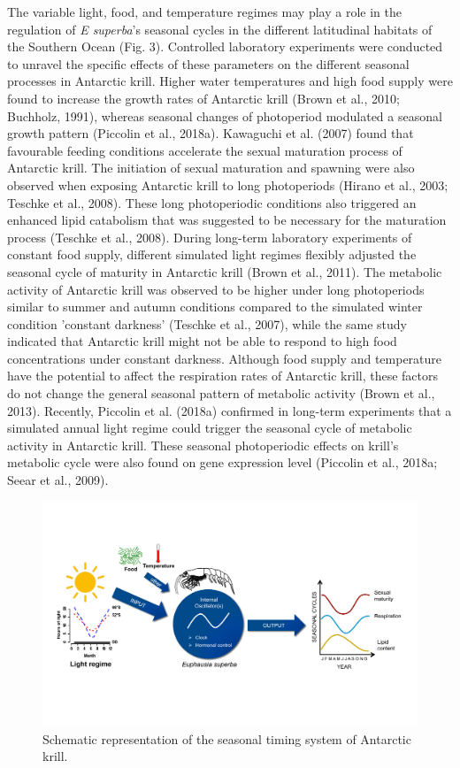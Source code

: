 The variable light, food, and temperature regimes may play a role in the
regulation of \textit{E superba}'s seasonal cycles in the different latitudinal
habitats of the Southern Ocean (Fig. 3). Controlled laboratory experiments were
conducted to unravel the specific effects of these parameters on the different
seasonal processes in Antarctic krill. Higher water temperatures and high food
supply were found to increase the growth rates of Antarctic krill (Brown et
al., 2010; Buchholz, 1991), whereas seasonal changes of photoperiod modulated a
seasonal growth pattern (Piccolin et al., 2018a). Kawaguchi et al. (2007) found
that favourable feeding conditions accelerate the sexual maturation process of
Antarctic krill. The initiation of sexual maturation and spawning were also
observed when exposing Antarctic krill to long photoperiods (Hirano et al.,
2003; Teschke et al., 2008). These long photoperiodic conditions also triggered
an enhanced lipid catabolism that was suggested to be necessary for the
maturation process (Teschke et al., 2008). During long-term laboratory
experiments of constant food supply, different simulated light regimes flexibly
adjusted the seasonal cycle of maturity in Antarctic krill (Brown et al.,
2011). The metabolic activity of Antarctic krill was observed to be higher
under long photoperiods similar to summer and autumn conditions compared to the
simulated winter condition 'constant darkness' (Teschke et al., 2007), while
the same study indicated that Antarctic krill might not be able to respond to
high food concentrations under constant darkness. Although food supply and
temperature have the potential to affect the respiration rates of Antarctic
krill, these factors do not change the general seasonal pattern of metabolic
activity (Brown et al., 2013). Recently, Piccolin et al. (2018a) confirmed in
long-term experiments that a simulated annual light regime could trigger the
seasonal cycle of metabolic activity in Antarctic krill. These seasonal
photoperiodic effects on krill's metabolic cycle were also found on gene
expression level (Piccolin et al., 2018a; Seear et al., 2009). 


\begin{figure}
        \caption{Schematic representation of the seasonal timing system of Antarctic krill.}
        \centering
        \includegraphics[width=0.85\pagewidth]{../Figures/Figure3.pdf}
\end{figure}


